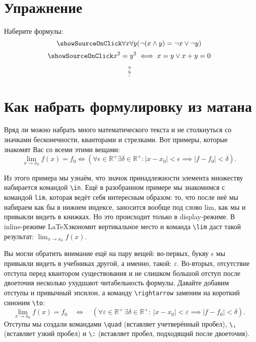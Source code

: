 \section{Упражнение}
\begin{staticpart}
Наберите формулы: \[\showSourceOnClick  \forall x\forall y(\lnot (x\land y)=\lnot x\lor \lnot y) \] \[\showSourceOnClick  x^2 = y^2 \iff x=y \lor x+y=0 \]
\end{staticpart}
\[ ? \]
\[ ? \]

\section{Как набрать формулировку из матана}
\par Вряд ли можно набрать много математического текста и не столкнуться со значками бесконечности, кванторами и стрелками. Вот примеры, которые знакомят Вас со всеми этими вещами:
\[\lim_{x\rightarrow x_0}f(x)=f_0 \iff ( \forall \epsilon\in\mathbb{R}^+ \exists \delta\in\mathbb{R}^+: |x-x_0|<\epsilon \implies |f-f_0|<\delta ). \]
\par Из этого примера мы узнаём, что значок принадлежности элемента множеству набирается командой \verb"\in". Ещё в разобранном примере мы знакомимся с командой \verb"lim"\index{\lim}, которая ведёт себя интересным образом: то, что после неё мы набираем как бы в нижнем индексе, заносится вообще под слово lim, как мы и привыкли видеть в книжках. Но это происходит только в display-режиме. В inline-режиме \LaTeX экономит вертикальное место и команда \verb"\lim" даст такой результат: \( \lim_{x\rightarrow x_0}f(x) \).
\par Вы могли обратить внимание ещё на пару вещей: во-первых, букву \( \epsilon \) мы привыкли видеть в учебниках другой, а именно, такой: \( \varepsilon \). Во-вторых, отсутствие отступа перед квантором существования и не слишком большой отступ после двоеточия несколько ухудшают читабельность формулы. Давайте добавим отступы и привычный эпсилон, а команду \verb"\rightarrow" заменим на короткий синоним \verb"\to":
\[\lim_{x\to x_0}f(x)=f_0\quad \iff\quad ( \forall \varepsilon\in\mathbb{R}^+ \, \exists \delta\in\mathbb{R}^+:\: |x-x_0|<\varepsilon \implies |f-f_0|<\delta ). \]
Отступы мы создали командами \verb"\quad" (вставляет учетверённый пробел), \verb"\," (вставляет узкий пробел) и \verb"\:" (вставляет пробел, подходящий после двоеточия).

